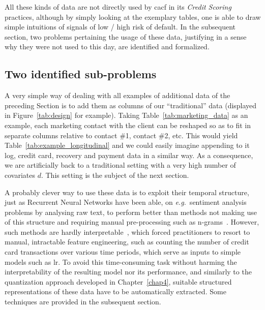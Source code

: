 All these kinds of data are not directly used by \gls{cacf} in its \textit{Credit Scoring} practices, although by simply looking at the exemplary tables, one is able to draw simple intuitions of signals of low / high risk of default. In the subsequent section, two problems pertaining the usage of these data, justifying in a sense why they were not used to this day, are identified and formalized.


\subsection{Two identified sub-problems}

A very simple way of dealing with all examples of additional data of the preceding Section is to add them as columns of our ``traditional'' data (displayed in Figure~\ref{tab:design} for example). Taking Table~\ref{tab:marketing_data} as an example, each marketing contact with the client can be reshaped so as to fit in separate columns relative to contact \#1, contact \#2, etc. This would yield Table~\ref{tab:example_longitudinal} and we could easily imagine appending to it log, credit card, recovery and payment data in a similar way. As a consequence, we are artificially back to a traditional setting with a very high number of covariates $d$. This setting is the subject of the next section. 

A probably clever way to use these data is to exploit their temporal structure, just as Recurrent Neural Networks have been able, on \textit{e.g.}\ sentiment analysis problems by analysing raw text, to perform better than methods not making use of this structure and requiring manual pre-processing such as n-grams~\cite{manning1999foundations}. However, such methods are hardly interpretable~\cite{lou2012intelligible}, which forced practitioners to resort to manual, intractable feature engineering, such as counting the number of credit card transactions over various time periods, which serve as inputs to simple models such as \gls{lr}. To avoid this time-consuming task without harming the interpretability of the resulting model nor its performance, and similarly to the quantization approach developed in Chapter~\ref{chap4}, suitable structured representations of these data have to be automatically extracted. Some techniques are provided in the subsequent section.

